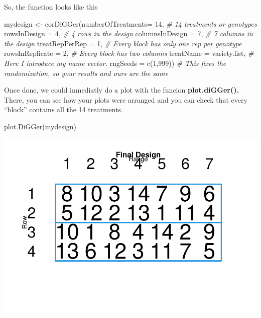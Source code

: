 \documentclass[
]{book}
\newenvironment{Shaded}{\begin{snugshade}}{\end{snugshade}}
\newcommand{\AttributeTok}[1]{\textcolor[rgb]{0.77,0.63,0.00}{#1}}
\newcommand{\CommentTok}[1]{\textcolor[rgb]{0.56,0.35,0.01}{\textit{#1}}}
\newcommand{\DecValTok}[1]{\textcolor[rgb]{0.00,0.00,0.81}{#1}}
\newcommand{\FunctionTok}[1]{\textcolor[rgb]{0.00,0.00,0.00}{#1}}
\newcommand{\NormalTok}[1]{#1}
\newcommand{\OtherTok}[1]{\textcolor[rgb]{0.56,0.35,0.01}{#1}}
\begin{document}
So, the function looks like this

\begin{Shaded}
\begin{Highlighting}[]
\NormalTok{mydesign }\OtherTok{\textless{}{-}} \FunctionTok{corDiGGer}\NormalTok{(}\AttributeTok{numberOfTreatments=} \DecValTok{14}\NormalTok{,    }\CommentTok{\# 14 treatments or genotypes}
                  \AttributeTok{rowsInDesign =} \DecValTok{4}\NormalTok{,              }\CommentTok{\# 4 rows in the design}
                  \AttributeTok{columnsInDesign =} \DecValTok{7}\NormalTok{,           }\CommentTok{\# 7 columns in the design}
                  \AttributeTok{treatRepPerRep =} \DecValTok{1}\NormalTok{,            }\CommentTok{\# Every block has only one rep per genotype}
                  \AttributeTok{rowsInReplicate =} \DecValTok{2}\NormalTok{,           }\CommentTok{\# Every block has two columns}
                  \AttributeTok{treatName =}\NormalTok{ variety.list,      }\CommentTok{\# Here I introduce my name vector.}
                  \AttributeTok{rngSeeds =} \FunctionTok{c}\NormalTok{(}\DecValTok{1}\NormalTok{,}\DecValTok{999}\NormalTok{))           }\CommentTok{\# This fixes the randomization, so your results and ours are the same}
\end{Highlighting}
\end{Shaded}

Once done, we could inmediatly do a plot with the funcion \textbf{plot.diGGer().} There, you can see how your plots were arranged and you can check that every ``block'' contains all the 14 treatments.

\begin{Shaded}
\begin{Highlighting}[]
\FunctionTok{plot.DiGGer}\NormalTok{(mydesign)}
\end{Highlighting}
\end{Shaded}

\includegraphics{PPB-Toolkit-for-R-and-R-Studio_files/figure-latex/unnamed-chunk-79-1.pdf}
\end{document}
